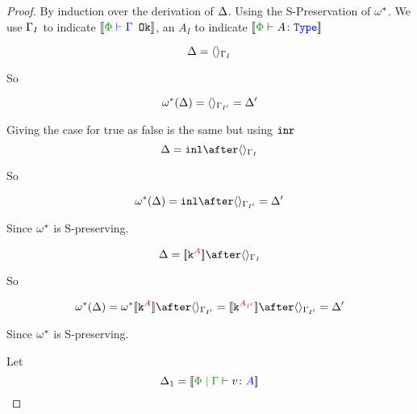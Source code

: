 \documentclass{report}
\begin{document}
\begin{framed}
    \begin{proof}
        By induction over the derivation of $\Delta$. Using the S-Preservation of $\omega^*$. We use $\Gamma_I$ to indicate $\deno{\wellformedok{\P}{\G}}$, an $A_I$ to indicate $\deno{\typerelation{\P}{A}{\type}}$
        
        \case{\vunit}
        
        \begin{equation}
            \Delta = \langle\rangle_{\Gamma_I}
        \end{equation}
        
        So
        
        \begin{equation}
            \omega^*(\Delta) = \langle\rangle_{\Gamma_{I'}} = \Delta'
        \end{equation}
        
        \case{\vtrue, \vfalse}
        Giving the case for true as false is the same but using $\texttt{inr}$
        \begin{equation}
            \D = \inl\after\term{\G_I}
        \end{equation}
        
        So
        
        \begin{equation}
            \w\star(\D) = \inl\after \term{\G_{I'}} = \D'
        \end{equation}
        
        Since $\omega^*$ is S-preserving.
        
        \case{\vconst}
        
        
        \begin{equation}
            \D = \deno{\const{A}}\after\term{\G_I}
        \end{equation}
        
        So
        
        \begin{equation}
            \w\star(\D) = \w\star\deno{\const{A}}\after \term{\G_{I'}}=\deno{\const{A_{I'}}}\after \term{\G_{I'}}  = \D'
        \end{equation}
        
        Since $\omega^*$ is S-preserving.
        
        \case{\vsubtype}
        
        Let \begin{equation}
            \D_1 = \deno{\gpetyperelation{v}{A}}
        \end{equation}
        

\end{proof}
\end{framed}
\end{document}
